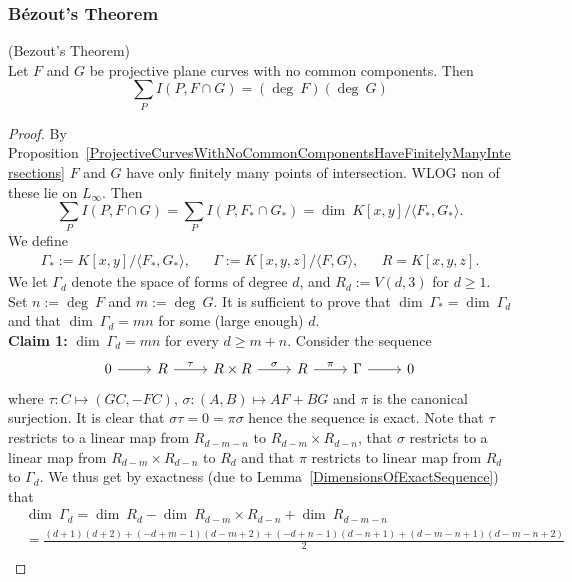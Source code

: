 \subsubsection{Bézout's Theorem}
    \begin{theorem}\label{BezoutTheorem}(Bezout's Theorem)\\
    Let $F$ and $G$ be projective plane curves with no common components. Then 
        $$
            \sum_P I(P, F\cap G) = (\deg \ F)(\deg \ G)
        $$
    \end{theorem}
    \begin{proof}
        By Proposition~\ref{ProjectiveCurvesWithNoCommonComponentsHaveFinitelyManyIntersections} $F$ and $G$ have only finitely many points of intersection. WLOG non of these lie on $L_\infty$. Then 
        $$\sum_P I(P,F\cap G) = \sum_P I(P,F_\ast\cap G_\ast) = \dim\ K[x,y]/\langle F_\ast,G_\ast\rangle.$$
        We define 
        $$
        \begin{matrix}
            \Gamma_\ast := K[x,y]/\langle F_\ast,G_\ast\rangle, && \Gamma:= K[x,y,z]/\langle F,G\rangle, && R = K[x,y,z].
        \end{matrix}
        $$
        We let $\Gamma_d$ denote the space of forms of degree $d$, and $R_d := V(d,3)$ for $d\geq 1$. Set $n:= \deg \ F$ and $m:= \deg \ G.$ It is sufficient to prove that $\dim\ \Gamma_\ast = \dim\ \Gamma_d$ and that $\dim\ \Gamma_d = mn$ for some (large enough) $d$.\\ 
        \textbf{Claim 1:} $\dim\ \Gamma_d = mn$ for every $d\geq m+n$. Consider the 
        sequence 
        $$\begin{tikzcd}
            0 \arrow[r] & R \arrow[r,"\tau"] & R\times R \arrow[r,"\sigma"] & R \arrow[r,"\pi"] & \Gamma \arrow[r] & 0
        \end{tikzcd}$$
        where $\tau: C\mapsto (GC,-FC)$, $\sigma: (A,B)\mapsto AF+BG$ and $\pi$ is the canonical surjection. It is clear that $\sigma \tau=0=\pi\sigma$ hence the sequence is exact. Note that $\tau$ restricts to a linear map from $R_{d-m-n}$ to $R_{d-m}\times R_{d-n}$, that $\sigma$ restricts to a linear map from $R_{d-m}\times R_{d-n}$ to $R_d$ and that $\pi$ restricts to linear map from $R_d$ to $\Gamma_d$. We thus get by exactness (due to Lemma~\ref{DimensionsOfExactSequence}) that 
        \begin{align*}
            &\dim\ \Gamma_d = \dim\ R_d-\dim\ R_{d-m}\times R_{d-n}+\dim\ R_{d-m-n}\\
            &=\frac{(d+1)(d+2)+(-d+m-1)(d-m+2) +(-d+n-1)(d-n+1)+(d-m-n+1)(d-m-n+2)}{2}\\

\end{align*}
\end{proof}
